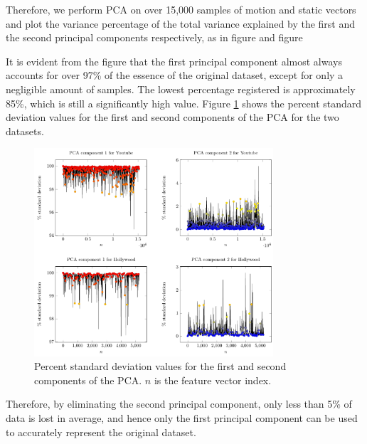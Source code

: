 Therefore, we perform PCA on over 15,000 samples of motion and static
vectors and plot the variance percentage of the total variance
explained by the first and the second principal components respectively, as in figure and figure


It is evident from the figure that the first principal component almost always accounts
for over 97\% of the essence of the original dataset, except for only a negligible amount
of samples. The lowest percentage registered is approximately 85\%, which is still a
significantly high value. Figure \ref{fi:pca} shows the percent standard deviation values for the first and second components of the PCA for the two datasets.

\begin{figure}
  \centering
  \includegraphics[width=3.5in]{figures/pca.pdf}
  \caption{Percent standard deviation values for the first and second components of the PCA. $n$ is the feature vector index. }\label{fi:pca}
\end{figure}


Therefore, by eliminating the second principal component, only less than 5\% of data
is lost in average, and hence only the first principal component can be used to accurately
represent the original dataset.    